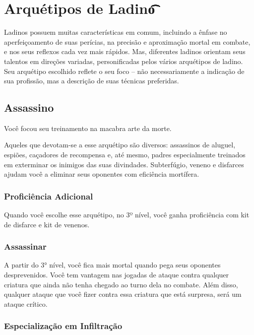 \documentclass{RPG_Adventure}[2021/10/20]
\begin{document}
\section*{Arquétipos de Ladino\t\t\t\t\t}%
\label{sec:arquetipos_de_ladino}

Ladinos possuem muitas características em comum, incluindo a ênfase no
aperfeiçoamento de suas perícias, na precisão e aproximação mortal em combate, e
nos seus reflexos cada vez mais rápidos. Mas, diferentes ladinos orientam seus
talentos em direções variadas, personificadas pelos vários arquétipos de ladino.
Seu arquétipo escolhido reflete o seu foco – não necessariamente a indicação de
sua profissão, mas a descrição de suas técnicas preferidas.

\subsection*{Assassino}%
\label{sub:assassino}

Você focou seu treinamento na macabra arte da morte.

Aqueles que devotam-se a esse arquétipo são diversos: assassinos de aluguel,
espiões, caçadores de recompensa e, até mesmo, padres especialmente treinados em
exterminar os inimigos das suas divindades. Subterfúgio, veneno e disfarces
ajudam você a eliminar seus oponentes com eficiência mortífera.

\subsubsection{Proficiência Adicional}%
\label{ssub:proficiencia_adicional}

Quando você escolhe esse arquétipo, no 3º nível, você ganha proficiência com kit
de disfarce e kit de venenos.

\subsubsection{Assassinar}%
\label{ssub:assassinar}

A partir do 3° nível, você fica mais mortal quando pega seus oponentes
desprevenidos. Você tem vantagem nas jogadas de ataque contra qualquer criatura
que ainda não tenha chegado ao turno dela no combate. Além disso, qualquer
ataque que você fizer contra essa criatura que está surpresa, será um ataque
crítico.

\subsubsection{Especialização em Infiltração}%
\label{ssub:especializacao_em_infiltracao}
\end{document}
